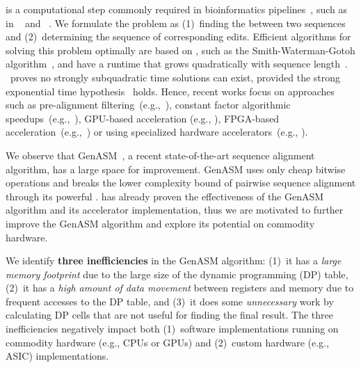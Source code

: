  is a computational step commonly required in bioinformatics pipelines~\citep{alser2022frommolecules}, such as in ~\cite{alser2020accelerating} and ~\citep{li2011denovo}. We formulate the problem as (1)~finding the  between two sequences~\citep{levenshtein1966binary} and (2)~determining the sequence of corresponding edits. Efficient algorithms for solving this problem optimally are based on , such as the Smith-Waterman-Gotoh algorithm~\citep{smith1981identification,gotoh1982improved}, and have a runtime that grows quadratically with sequence length~\citep{alser2020technology}. \citep{asm_lower_bound}~proves no strongly subquadratic time solutions can exist, provided the strong exponential time hypothesis~\citep{impagliazzo2001complexity} holds. Hence, recent works focus on approaches such as pre-alignment filtering~(e.g.,~\citep{xin2013fasthash,xin2015shiftedhammingdistance,alser2019shouji,alser2020sneakysnake,singh2021fpga,mansouri2022genstore}), constant factor algorithmic speedups~(e.g.,~\citep{edlib, ksw2_a, ksw2_b, wfa_algorithm}), GPU-based acceleration (e.g., \citep{gasal2,ahmed2020darwin_gpu,de2016cudalign,liu2013cudasw++,awan2020adept}), FPGA-based acceleration~(e.g.,~\citep{fei2018fpgasw, hoffmann2016using, benkrid2009highly}) or using specialized hardware accelerators~(e.g., \citep{ turakhia2019darwin,turakhia2019darwinwga,fujiki2018genax,fujiki2020seedex,cali2020genasm,cali2022segram}).

We observe that GenASM~\citep{cali2020genasm}, a recent state-of-the-art sequence alignment algorithm, has a large space for improvement. %
GenASM uses only cheap bitwise operations and breaks the lower complexity bound of pairwise sequence alignment through its powerful . \citep{cali2020genasm} has already proven the effectiveness of the GenASM algorithm and its accelerator implementation, thus we are motivated to further improve the GenASM algorithm and explore its potential on commodity hardware.

We identify \textbf{three inefficiencies} in the GenASM algorithm: (1)~it has a \emph{large memory footprint} due to the large size of the dynamic programming (DP) table, (2)~it has a \emph{high amount of data movement} between registers and memory due to frequent accesses to the DP table, and (3)~it does some \emph{unnecessary} work by calculating DP cells that are not useful for finding the final result.
The three inefficiencies negatively impact both (1)~software implementations running on commodity hardware (e.g., CPUs or GPUs) and (2)~custom hardware (e.g., ASIC) implementations.

